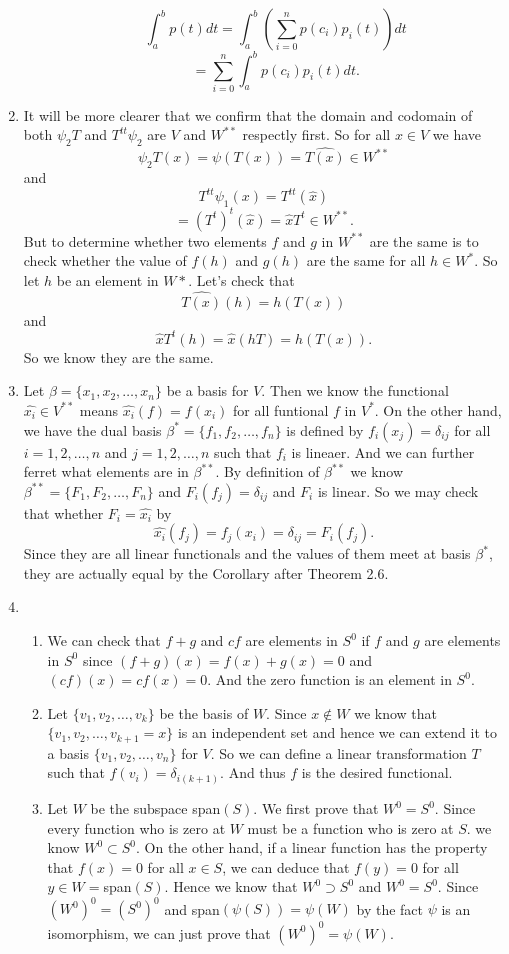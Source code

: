\begin{enumerate}
\begin{enumerate}
\[\int_a^b{p(t)dt}=\int_a^b{(\sum_{i=0}^n{p(c_i)p_i(t)})dt}\]
\[=\sum_{i=0}^n{\int_a^b{p(c_i)p_i(t)dt}}.\]
\end{enumerate}
\item It will be more clearer that we confirm that the domain and codomain of both $\psi_2T$ and $T^{tt}\psi_2$ are $V$ and $W^{**}$ respectly first.
So for all $x\in V$ we have 
\[\psi_2T(x)=\psi(T(x))=\hat{T(x)}\in W^{**}\]
and 
\[T^{tt}\psi_1(x)=T^{tt}(\hat{x})\]
\[=(T^t)^t(\hat{x})=\hat{x}T^t\in W^{**}.\]
But to determine whether two elements $f$ and $g$ in $W^{**}$ are the same is to check whether the value of $f(h)$ and $g(h)$ are the same for all $h\in W^*$. So let $h$ be an element in $W*$. Let's check that 
\[\hat{T(x)}(h)=h(T(x))\]
and 
\[\hat{x}T^t(h)=\hat{x}(hT)=h(T(x)).\]
So we know they are the same.
\item Let $\beta =\{x_1,x_2,\ldots ,x_n\}$ be a basis for $V$. Then we know the functional $\hat{x_i}\in V^{**}$ means $\hat{x_i}(f)=f(x_i)$ for all funtional $f$ in $V^*$. On the other hand, we have the dual basis $\beta^*=\{f_1,f_2,\ldots, f_n\}$ is defined by $f_i(x_j)=\delta_{ij}$ for all $i=1,2,\ldots ,n$ and $j=1,2,\ldots ,n$ such that $f_i$ is lineaer. And we can further ferret what elements are in $\beta^{**}$. By definition of $\beta ^{**}$ we know $\beta^{**}=\{F_1,F_2,\ldots, F_n\}$ and $F_i(f_j)=\delta_{ij}$ and $F_i$ is linear. So we may check that whether $F_i=\hat{x_i}$ by 
\[\hat{x_i}(f_j)=f_j(x_i)=\delta_{ij}=F_i(f_j).\]
Since they are all linear functionals and the values of them meet at basis $\beta^*$, they are actually equal by the Corollary after Theorem 2.6.
\item \begin{enumerate}
\item We can check that $f+g$ and $cf$ are elements in $S^0$ if $f$ and $g$ are elements in $S^0$ since $(f+g)(x)=f(x)+g(x)=0$ and $(cf)(x)=cf(x)=0$. And the zero function is an element in $S^0$.
\item Let $\{v_1,v_2,\ldots ,v_k\}$ be the basis of $W$. Since $x\notin W$ we know that $\{v_1,v_2,\ldots ,v_{k+1}=x\}$ is an independent set and hence we can extend it to a basis $\{v_1,v_2,\ldots ,v_n\}$ for $V$. So we can define a linear transformation $T$ such that $f(v_i)=\delta_{i(k+1)}$. And thus $f$ is the desired functional.
\item Let $W$ be the subspace span$(S)$. We first prove that $W^0=S^0$. Since every function who is zero at $W$ must be a function who is zero at $S$. we know $W^0\subset S^0$. On the other hand, if a linear function has the property that $f(x)=0$ for all $x\in S$, we can deduce that $f(y)=0$ for all $y\in W=$span$(S)$. Hence we know that $W^0\supset S^0$ and $W^0=S^0$. Since $(W^0)^0=(S^0)^0$ and span$(\psi(S))=\psi(W)$ by the fact $\psi$ is an isomorphism, we can just prove that $(W^0)^0=\psi(W)$.


\end{enumerate}
\end{enumerate}
